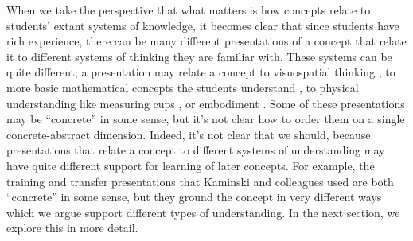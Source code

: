 \documentclass[man,10pt]{apa6}
\begin{document}
When we take the perspective that what matters is how concepts relate to students' extant systems of knowledge, it becomes clear that since students have rich experience, there can be many different presentations of a concept that relate it to different systems of thinking they are familiar with. These systems can be quite different; a presentation may relate a concept to visuospatial thinking \cite{Rau2016}, to more basic mathematical concepts the students understand \cite{Hazzan1999}, to physical understanding like measuring cups \cite{Kaminski2008}, or embodiment \cite{Nathan2008}. Some of these presentations may be ``concrete'' in some sense, but it's not clear how to order them on a single concrete-abstract dimension. Indeed, it's not clear that we should, because presentations that relate a concept to different systems of understanding may have quite different support for learning of later concepts. For example, the training and transfer presentations that Kaminski and colleagues used are both ``concrete'' in some sense, but they ground the concept in very different ways which we argue support different types of understanding. In the next section, we explore this in more detail. 
\end{document}

